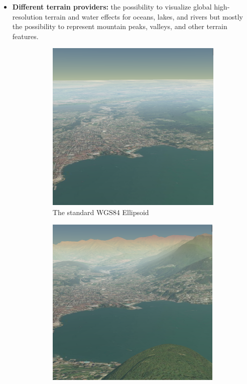 \begin{itemize}
	\item {\bf Different terrain providers:} the possibility to visualize global high-resolution terrain and water effects for oceans, lakes, and rivers but mostly the possibility to represent mountain peaks, valleys, and other terrain features. 
	\begin{figure} [H]
		\centering
		\begin{subfigure}[b]{0.3\textwidth}
			\includegraphics[width=1\textwidth]{chapter2/images/2D-Map}
			\caption{The standard WGS84 Ellipsoid}
			\label{fig:2D-Map}
		\end{subfigure}
		 \qquad
		\begin{subfigure}[b]{0.3\textwidth}
			\includegraphics[width=0.993\textwidth]{chapter2/images/3D-Map}

\end{subfigure}
\end{figure}
\end{itemize}
